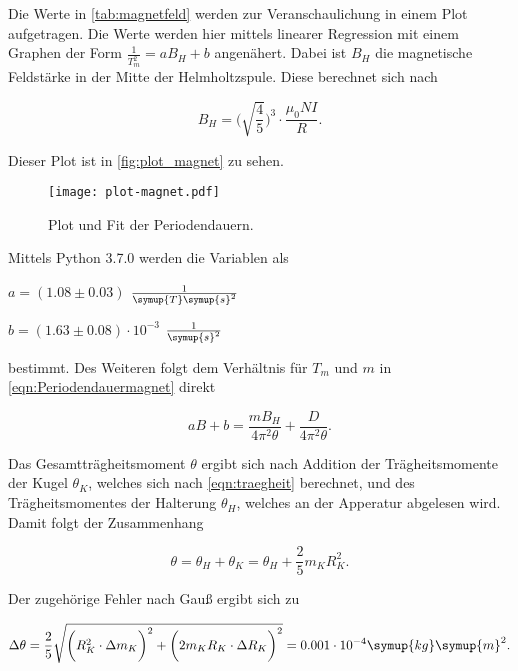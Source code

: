

Die Werte in \autoref{tab:magnetfeld} werden zur Veranschaulichung in einem Plot aufgetragen. Die Werte werden hier mittels linearer Regression mit einem Graphen der Form $\frac{1}{T_m^2} = aB_H + b$ angenähert.
Dabei ist $B_H$ die magnetische Feldstärke in der Mitte der Helmholtzspule. Diese berechnet sich nach

\begin{equation}
    B_H = \bigg( \sqrt{\frac{4}{5}} \bigg)^3 \cdot \frac{\mu_0 N I}{R}.
\end{equation}

Dieser Plot ist in \autoref{fig:plot_magnet} zu sehen.

\begin{figure}
  \centering
  \texttt{[image: plot-magnet.pdf]}
  \caption{Plot und Fit der Periodendauern.}
  \label{fig:plot_magnet}
\end{figure}

Mittels Python 3.7.0 werden die Variablen als

\vspace{.5em}
\centerline{$a = (1.08 \pm 0.03)$ $\frac{1}{\symup{T} \symup{s}^2}$}

\centerline{$b = (1.63 \pm 0.08) \cdot 10^{-3}$ $\frac{1}{\symup{s}^2}$}
\vspace{.5em}

bestimmt. Des Weiteren folgt dem Verhältnis für $T_m$ und $m$ in \eqref{eqn:Periodendauermagnet} direkt

\begin{equation}
\label{eqn:verhalt}
  aB + b = \frac{mB_H}{4 \pi^2 \theta} + \frac{D}{4 \pi^2 \theta}.
\end{equation}

Das Gesamtträgheitsmoment $\theta$ ergibt sich nach Addition der Trägheitsmomente der Kugel $\theta_K$, welches sich nach \eqref{eqn:traegheit} berechnet, und des Trägheitsmomentes der Halterung $\theta_H$, welches an der Apperatur abgelesen wird.
Damit folgt der Zusammenhang

\begin{equation}
  \theta = \theta_H + \theta_K = \theta_H + \frac {2}{5} m_K R_K^{2}.
\end{equation}

Der zugehörige Fehler nach Gauß ergibt sich zu

\begin{equation}
  \Delta \theta = \frac{2}{5} \sqrt{ \bigg( R_K^2 \cdot \Delta m_K \bigg)^2 + \bigg( 2m_K R_K \cdot \Delta R_K \bigg)^2 } = 0.001 \cdot 10^{-4} \symup{kg} \symup{m}^2.
\end{equation}

